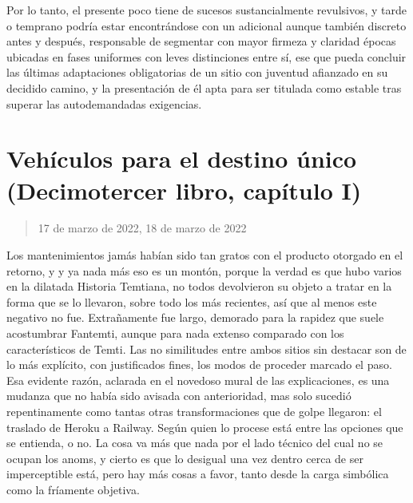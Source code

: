 \documentclass[
]{book}
\begin{document}
Por lo tanto, el presente poco tiene de sucesos sustancialmente revulsivos, y tarde o temprano podría estar encontrándose con un adicional aunque también discreto antes y después, responsable de segmentar con mayor firmeza y claridad épocas ubicadas en fases uniformes con leves distinciones entre sí, ese que pueda concluir las últimas adaptaciones obligatorias de un sitio con juventud afianzado en su decidido camino, y la presentación de él apta para ser titulada como estable tras superar las autodemandadas exigencias.

\hypertarget{vehuxedculos-para-el-destino-uxfanico-decimotercer-libro-capuxedtulo-i}{%
\section{Vehículos para el destino único (Decimotercer libro, capítulo I)}\label{vehuxedculos-para-el-destino-uxfanico-decimotercer-libro-capuxedtulo-i}}

\begin{quote}
17 de marzo de 2022, 18 de marzo de 2022
\end{quote}

Los mantenimientos jamás habían sido tan gratos con el producto otorgado en el retorno, y y ya nada más eso es un montón, porque la verdad es que hubo varios en la dilatada Historia Temtiana, no todos devolvieron su objeto a tratar en la forma que se lo llevaron, sobre todo los más recientes, así que al menos este negativo no fue. Extrañamente fue largo, demorado para la rapidez que suele acostumbrar Fantemti, aunque para nada extenso comparado con los característicos de Temti. Las no similitudes entre ambos sitios sin destacar son de lo más explícito, con justificados fines, los modos de proceder marcado el paso. Esa evidente razón, aclarada en el novedoso mural de las explicaciones, es una mudanza que no había sido avisada con anterioridad, mas solo sucedió repentinamente como tantas otras transformaciones que de golpe llegaron: el traslado de Heroku a Railway. Según quien lo procese está entre las opciones que se entienda, o no. La cosa va más que nada por el lado técnico del cual no se ocupan los anoms, y cierto es que lo desigual una vez dentro cerca de ser imperceptible está, pero hay más cosas a favor, tanto desde la carga simbólica como la fríamente objetiva.
\end{document}
